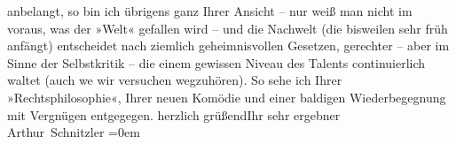 \begin{ledgroupsized}[t]{13cm}
               anbelangt, so bin ich übrigens ganz Ihrer Ansicht – nur weiß man nicht im voraus, was
               der »Welt« gefallen wird – und die Nachwelt (die bisweilen sehr früh anfängt) ent{\pb}scheidet nach ziemlich geheimnisvollen Gesetzen, gerechter
               – aber im Sinne der Selbstkritik – die einem gewissen Niveau des Talents
               continuierlich waltet (auch we{\geminationn} wir versuchen
               wegzuhören).\pend
           \pstart
           So sehe ich Ihrer »Rechtsphilosophie«, Ihrer
               neuen Komödie und einer baldigen Wiederbegegnung mit Vergnügen entgegegen.\pend
           \pstart
           herzlich grüßend\hspace*{1.5em}Ihr sehr ergebner{\\[\baselineskip]}\spacefill\mbox{Arthur Schnitzler}\pend
           \leftskip=0em{}
         
         \endnumbering{}\end{ledgroupsized}  \newcommand{\dateiname}{L02216}\newcommand{\titel}{Arthur Schnitzler an Robert Adam, 20. 7. 1915}\newcommand{\editorInnen}{Martin Anton Müller und Gerd-Hermann Susen}
      